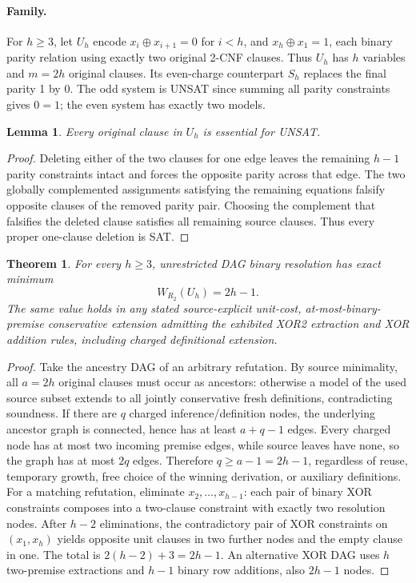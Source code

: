 \documentclass[11pt]{article}
\newtheorem{theorem}{Theorem}
\newtheorem{lemma}{Lemma}
\begin{document}
\paragraph{Family.} For \(h\ge3\), let \(U_h\) encode \(x_i\oplus x_{i+1}=0\) for \(i<h\), and \(x_h\oplus x_1=1\), each binary parity relation using exactly two original 2-CNF clauses. Thus \(U_h\) has \(h\) variables and \(m=2h\) original clauses. Its even-charge counterpart \(S_h\) replaces the final parity 1 by 0. The odd system is UNSAT since summing all parity constraints gives \(0=1\); the even system has exactly two models.
\begin{lemma}Every original clause in \(U_h\) is essential for UNSAT.\end{lemma}
\begin{proof}Deleting either of the two clauses for one edge leaves the remaining \(h-1\) parity constraints intact and forces the opposite parity across that edge. The two globally complemented assignments satisfying the remaining equations falsify opposite clauses of the removed parity pair. Choosing the complement that falsifies the deleted clause satisfies all remaining source clauses. Thus every proper one-clause deletion is SAT.\end{proof}
\begin{theorem}For every \(h\ge3\), unrestricted DAG binary resolution has exact minimum
\[
\boxed{W_{R_2}(U_h)=2h-1}.
\]
The same value holds in any stated source-explicit unit-cost, at-most-binary-premise conservative extension admitting the exhibited XOR2 extraction and XOR addition rules, including charged definitional extension.\end{theorem}
\begin{proof}Take the ancestry DAG of an arbitrary refutation. By source minimality, all \(a=2h\) original clauses must occur as ancestors: otherwise a model of the used source subset extends to all jointly conservative fresh definitions, contradicting soundness. If there are \(q\) charged inference/definition nodes, the underlying ancestor graph is connected, hence has at least \(a+q-1\) edges. Every charged node has at most two incoming premise edges, while source leaves have none, so the graph has at most \(2q\) edges. Therefore \(q\ge a-1=2h-1\), regardless of reuse, temporary growth, free choice of the winning derivation, or auxiliary definitions. For a matching refutation, eliminate \(x_2,\ldots,x_{h-1}\): each pair of binary XOR constraints composes into a two-clause constraint with exactly two resolution nodes. After \(h-2\) eliminations, the contradictory pair of XOR constraints on \((x_1,x_h)\) yields opposite unit clauses in two further nodes and the empty clause in one. The total is \(2(h-2)+3=2h-1\). An alternative XOR DAG uses \(h\) two-premise extractions and \(h-1\) binary row additions, also \(2h-1\) nodes.\end{proof}
\end{document}
